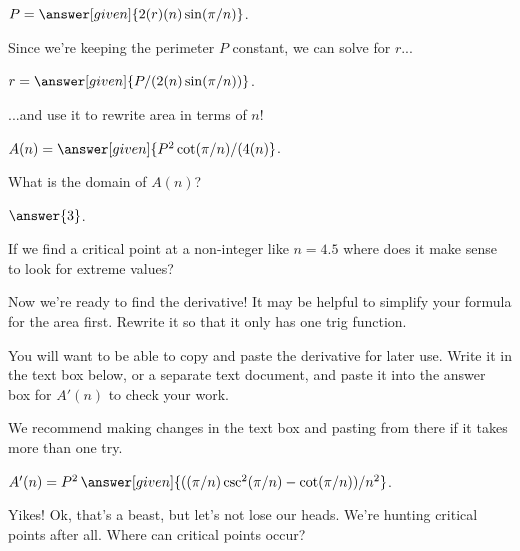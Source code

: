 \documentclass[handout,nooutcomes]{ximera}
\begin{document}
$P = \answer[given]{2(r)(n)\sin(\pi/n)}$.

Since we're keeping the perimeter $P$ constant, we can solve for $r$...

$r = \answer[given]{P/(2(n)\sin(\pi/n))}$.

...and use it to rewrite area in terms of $n$!

$A(n) = \answer[given]{P^2\cot(\pi/n)/(4(n)}$.

\bigskip

What is the domain of $A(n)$? 

  $\answer{3}$.

\begin{freeResponse}
If we find a critical point at a non-integer like $n = 4.5$ where does it make sense to look for extreme values?
\end{freeResponse}

\bigskip

\hspace{2cm}Now we're ready to find the derivative! It may be helpful to simplify your formula for the area first. Rewrite it so that it only has one trig function.

You will want to be able to copy and paste the derivative for later use. Write it in the text box below, or a separate text document, and paste it into the answer box for $A'(n)$ to check your work.

\begin{freeResponse}
We recommend making changes in the text box and pasting from there if it takes more than one try.
\end{freeResponse}

$A'(n) = P^2\,\answer[given]{((\pi/n)\csc^2(\pi/n)-\cot(\pi/n))/n^2}$.

\bigskip

\hspace{2cm}Yikes! Ok, that's a beast, but let's not lose our heads. We're hunting critical points after all. Where can critical points occur?
\begin{selectAll}
\end{selectAll}

\bigskip
\end{document}
